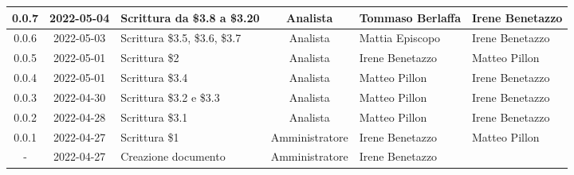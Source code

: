 \begin{center}
\begin{longtable}{ |c|c|p{8em}|c|m{5em}|m{5em}| }
	\hline
    0.0.7 & 2022-05-04 & Scrittura \newline da \$3.8 a \$3.20 & Analista & Tommaso \newline Berlaffa & Irene \newline Benetazzo\\
    \hline
    0.0.6 & 2022-05-03 & Scrittura \newline \$3.5, \$3.6, \$3.7 & Analista & Mattia \newline Episcopo & Irene \newline Benetazzo\\
	\hline
    0.0.5 & 2022-05-01 & Scrittura \$2 & Analista & Irene \newline Benetazzo & Matteo \newline Pillon\\
	\hline
    0.0.4 & 2022-05-01 & Scrittura \$3.4 & Analista & Matteo \newline Pillon & Irene \newline Benetazzo\\
	\hline
    0.0.3 & 2022-04-30 & Scrittura \newline \$3.2 e \$3.3 & Analista & Matteo \newline Pillon & Irene \newline Benetazzo\\
	\hline
    0.0.2 & 2022-04-28 & Scrittura \$3.1 & Analista & Matteo \newline Pillon & Irene \newline Benetazzo\\
	\hline
	0.0.1 & 2022-04-27 & Scrittura \$1 & Amministratore & Irene \newline Benetazzo & Matteo \newline Pillon\\
	\hline
	- & 2022-04-27 & Creazione \newline documento & Amministratore & Irene \newline Benetazzo & \\
	\hline
	\end{longtable}
	\end{center}
	\newpage